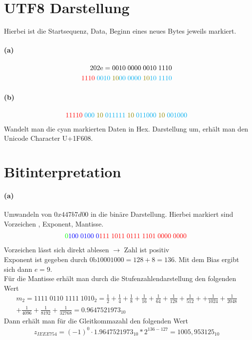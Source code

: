 \documentclass[a4paper]{article}
\begin{document}
\section{UTF8 Darstellung}
Hierbei ist die \color{red} Startsequenz, \color{cyan} Data, \color{olive} Beginn eines neues Bytes \color{black} jeweils markiert. 
\paragraph{(a)}
\begin{align*}
    \text{202e}=0010\;0000\;0010\;1110\\
    \color{red}1110\;\color{cyan}0010\;\color{olive}10\color{cyan}00\;0000\;\color{olive}10\color{cyan}10\;1110\\
\end{align*}


\paragraph{(b)}
\begin{align*}
    \color{red}11110\; \color{cyan} 000\; \color{olive}10\; \color{cyan}011111\; \color{olive}10\;\color{cyan}011000\; \color{olive}10 \;\color{cyan} 001000\\
\end{align*}
Wandelt man die \color{cyan}cyan \color{black} markierten Daten in Hex. Darstellung um, erhält man den Unicode Character U+1F608.

\section{Bitinterpretation}

\paragraph{(a)}
Umwandeln von $0x447b7d00$ in die binäre Darstellung. Hierbei markiert sind \color{green} Vorzeichen \color{black},\color{blue} Exponent\color{black},\color{red} Mantisse.
\begin{align*}
    \color{green}0\color{blue}100\;0100\;0\color{red}111\;1011\;0111\;1101\;0000\;0000\;
\end{align*}
\color{black}
Vorzeichen lässt sich direkt ablesen $\rightarrow$ Zahl ist positiv\\
Exponent ist gegeben durch $0\text{b}10001000=128+8=136$. Mit dem Bias ergibt sich dann $e=9$.\\ Für die Mantisse erhält man durch die Stufenzahlendarstellung den folgenden Wert
\begin{align*}
    m_2=1111\;0110\;1111\;1010_2=\frac{1}{2}+\frac{1}{4}+\frac{1}{8}+\frac{1}{16}+\frac{1}{64}+\frac{1}{128}+\frac{1}{512}++\frac{1}{1024}+\frac{1}{2048}\\+\frac{1}{4096}+\frac{1}{8192}+\frac{1}{32768}=0.9647521973_{10}
\end{align*}
Dann erhält man für die Gleitkommazahl den folgenden Wert
\begin{align*}
    z_{IEEE754}=(-1)^0\cdot 1.9647521973_10*2^{136-127}=1005,953125_{10}
\end{align*}
\end{document}
